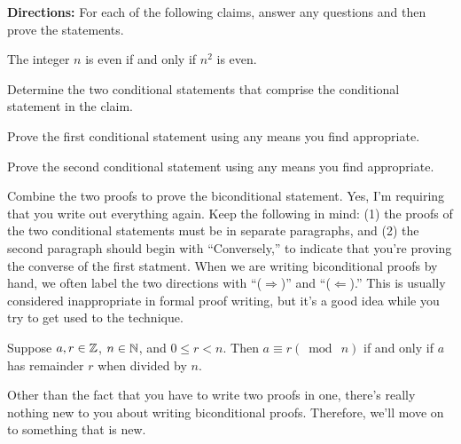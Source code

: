 \noindent \textbf{Directions:}  For each of the following claims, answer any questions and then prove the statements.
\begin{claim} The integer $n$ is even if and only if $n^2$ is even.
\end{claim}
\begin{mdframed}
	\begin{question}
	\item Determine the two conditional statements that comprise the conditional statement in the claim.
	\vspace{1in}
	\item Prove the first conditional statement using any means you find appropriate.
	\vspace{2in}
	\item Prove the second conditional statement using any means you find appropriate.
	\vspace{2in}
	\item Combine the two proofs to prove the biconditional statement.  Yes, I'm requiring that you write out everything again.  Keep the following in mind: (1) the proofs of the two conditional statements must be in separate paragraphs, and (2) the second paragraph should begin with ``Conversely,'' to indicate that you're proving the converse of the first statment.  When we are writing biconditional proofs by hand, we often label the two directions with ``($\Rightarrow$)'' and ``($\Leftarrow$).''  This is usually considered inappropriate in formal proof writing, but it's a good idea while you try to get used to the technique.
\vspace{4.75in}
	\end{question}
\end{mdframed}
	\newpage
	
\begin{claim} Suppose $a,r \in \mathbb{Z}$, $n \in \mathbb{N}$, and $0 \leq r <n$.  Then $a \equiv r (\bmod \ n)$ if and only if $a$ has remainder $r$ when divided by $n$.
\end{claim}
\vspace{4in}

\noindent  Other than the fact that you have to write two proofs in one, there's really nothing new to you about writing biconditional proofs.  Therefore, we'll move on to something that is new.

